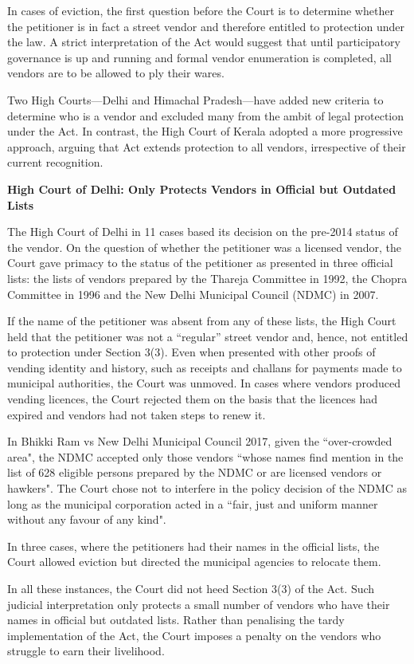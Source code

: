 \documentclass[a4paper, 12pt, twoside]{article}
\begin{document}
{In cases of eviction, the first question before the Court is to determine whether the petitioner is in fact a street vendor and therefore entitled to protection under the law. A strict interpretation of the Act would suggest that until participatory governance is up and running and formal vendor enumeration is completed, all vendors are to be allowed to ply their wares.

Two High Courts—Delhi and Himachal Pradesh—have added new criteria to determine who is a vendor and excluded many from the ambit of legal protection under the Act. In contrast, the High Court of Kerala adopted a more progressive approach, arguing that Act extends protection to all vendors, irrespective of their current recognition.

\textbf{High Court of Delhi: Only Protects Vendors in Official but Outdated Lists}

The High Court of Delhi in 11 cases based its decision on the pre-2014 status of the vendor. On the question of whether the petitioner was a licensed vendor, the Court gave primacy to the status of the petitioner as presented in three official lists: the lists of vendors prepared by the Thareja Committee in 1992, the Chopra Committee in 1996 and the New Delhi Municipal Council (NDMC) in 2007.

If the name of the petitioner was absent from any of these lists, the High Court held that the petitioner was not a “regular” street vendor and, hence, not entitled to protection under Section 3(3). Even when presented with other proofs of vending identity and history, such as receipts and challans for payments made to municipal authorities, the Court was unmoved. In cases where vendors produced vending licences, the Court rejected them on the basis that the licences had expired and vendors had not taken steps to renew it.

In Bhikki Ram vs New Delhi Municipal Council 2017, given the “over-crowded area", the NDMC accepted only those vendors “whose names find mention in the list of 628 eligible persons prepared by the NDMC or are licensed vendors or hawkers". The Court chose not to interfere in the policy decision of the NDMC as long as the municipal corporation acted in a “fair, just and uniform manner without any favour of any kind".

In three cases, where the petitioners had their names in the official lists, the Court allowed eviction but directed the municipal agencies to relocate them.

In all these instances, the Court did not heed Section 3(3) of the Act. Such judicial interpretation only protects a small number of vendors who have their names in official but outdated lists. Rather than penalising the tardy implementation of the Act, the Court imposes a penalty on the vendors who struggle to earn their livelihood.

}
\end{document}
